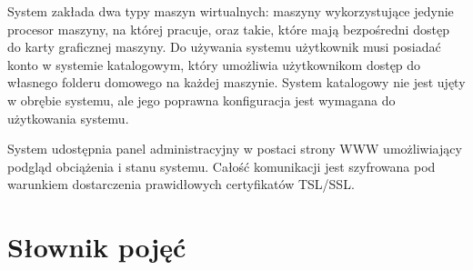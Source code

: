 \documentclass[12pt]{article}
\begin{document}
System zakłada dwa typy maszyn wirtualnych: maszyny wykorzystujące jedynie procesor maszyny, na której pracuje, oraz takie, które mają bezpośredni dostęp do karty graficznej maszyny. Do używania systemu użytkownik musi posiadać konto w systemie katalogowym, który umożliwia użytkownikom dostęp do własnego folderu domowego na każdej maszynie. System katalogowy nie jest ujęty w obrębie systemu, ale jego poprawna konfiguracja jest wymagana do użytkowania systemu.

System udostępnia panel administracyjny w postaci strony WWW umożliwiający podgląd obciążenia i stanu systemu. Całość komunikacji jest szyfrowana pod warunkiem dostarczenia prawidłowych certyfikatów TSL/SSL.

\section{Słownik pojęć}
\end{document}
